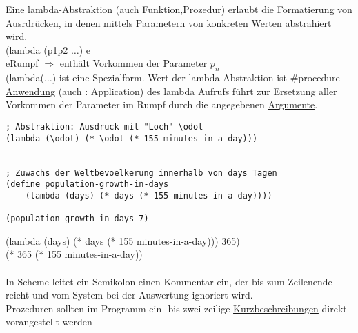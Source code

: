 Eine \underline{lambda-Abstraktion} (auch Funktion,Prozedur) erlaubt die Formatierung von Ausrdr\"ucken, in denen mittels \underline{Parametern} von konkreten Werten abstrahiert wird.\\
(lambda (\auf p1\zu \auf p2 \zu $\ldots$) \auf e\zu\\
\auf e\zu Rumpf $\Rightarrow$ enth\"alt Vorkommen der Parameter \auf $p_n$\zu\\
(lambda($\ldots$) ist eine Spezialform. Wert der lambda-Abstraktion ist \#\auf procedure\zu\\
\underline{Anwendung} (auch : Application) des lambda Aufrufs f\"uhrt zur Ersetzung aller Vorkommen der Parameter im Rumpf durch die angegebenen \underline{Argumente}.\\
\begin{lstlisting}[frame = single]
; Abstraktion: Ausdruck mit "Loch" \odot
(lambda (\odot) (* \odot (* 155 minutes-in-a-day)))


; Zuwachs der Weltbevoelkerung innerhalb von days Tagen
(define population-growth-in-days
    (lambda (days) (* days (* 155 minutes-in-a-day))))

(population-growth-in-days 7)
\end{lstlisting}
(lambda (days) (* days (* 155 minutes-in-a-day))) 365) \eval\\
 (* 365 (* 155 minutes-in-a-day)) \\
\linie\\
In Scheme leitet ein Semikolon einen Kommentar ein, der bis zum Zeilenende reicht und vom System bei der Auswertung ignoriert wird.\\
Prozeduren sollten im Programm ein- bis zwei zeilige \underline{Kurzbeschreibungen} direkt vorangestellt werden


